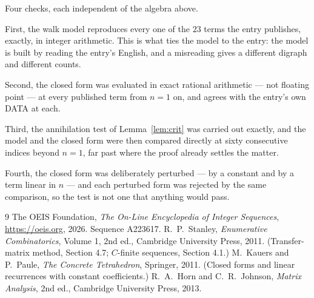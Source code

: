 \documentclass[11pt,a4paper]{article}
\theoremstyle{plain}
\theoremstyle{definition}
\begin{document}
Four checks, each independent of the algebra above.

First, the walk model reproduces every one of the $23$ terms the entry publishes,
exactly, in integer arithmetic. This is what ties the model to the entry: the model is built
by reading the entry's English, and a misreading gives a different digraph and different
counts.

Second, the closed form was evaluated in exact rational arithmetic --- not floating point ---
at every published term from $n=1$ on, and agrees with the entry's own DATA at each.

Third, the annihilation test of Lemma~\ref{lem:crit} was carried out exactly, and the model
and the closed form were then compared directly at sixty consecutive indices beyond
$n=1$, far past where the proof already settles the matter.

Fourth, the closed form was deliberately perturbed --- by a constant and by a term linear in
$n$ --- and each perturbed form was rejected by the same comparison, so the test is not one
that anything would pass.

\begin{thebibliography}{9}
 The OEIS Foundation, \emph{The On-Line Encyclopedia of Integer
Sequences}, \url{https://oeis.org}, 2026. Sequence A223617.
 R.~P.~Stanley, \emph{Enumerative Combinatorics}, Volume 1, 2nd ed.,
Cambridge University Press, 2011. (Transfer-matrix method, Section 4.7; $C$-finite sequences,
Section 4.1.)
 M.~Kauers and P.~Paule, \emph{The Concrete Tetrahedron}, Springer, 2011.
(Closed forms and linear recurrences with constant coefficients.)
 R.~A.~Horn and C.~R.~Johnson, \emph{Matrix Analysis}, 2nd ed., Cambridge
University Press, 2013.
\end{thebibliography}
\end{document}
